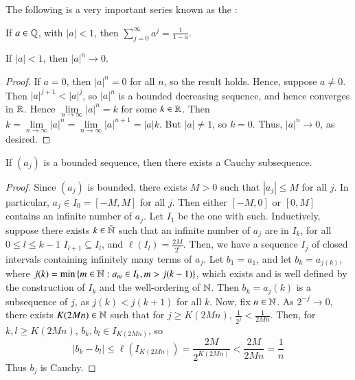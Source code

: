The following is a very important series known as the :

\begin{prop}
    If $a \in \mathbb Q$, with $|a| < 1$, then $\sum_{j=0}^{\infty}a^j = \frac{1}{1-a}$.
\end{prop}

\begin{prop}
    If $|a| < 1$, then $|a|^n\rightarrow 0$.
\end{prop}
\begin{proof}
    If $a = 0$, then $|a|^n = 0$ for all $n$, so the result holds. Hence, suppose $a \neq 0$. Then $|a|^{j+1} < |a|^j$, so $|a|^n$ is a bounded decreasing sequence, and hence converges in $\mathbb R$. Hence $\lim\limits_{n\rightarrow \infty}|a|^n = k$ for some $k \in \mathbb R$. Then $k = \lim\limits_{n\rightarrow \infty}|a|^n = \lim\limits_{n\rightarrow \infty}|a|^{n+1} = |a|k$. But $|a| \neq 1$, so $k = 0$. Thus, $|a|^n\rightarrow 0$, as desired.
\end{proof}


\begin{prop}
    If $(a_j)$ is a bounded sequence, then there exists a Cauchy subsequence.
\end{prop}
\begin{proof}
    Since $(a_j)$ is bounded, there exists $M > 0$ such that $|a_j| \leq M$ for all $j$. In particular, $a_j \in I_0 = [-M,M]$ for all $j$. Then either $[-M,0]$ or $[0,M]$ contains an infinite number of $a_j$. Let $I_1$ be the one with such. Inductively, suppose there exists $k \in \tilde{\mathbb N}$ such that an infinite number of $a_j$ are in $I_k$, for all $0 \leq l \leq k-1$ $I_{l+1}\subseteq I_l$, and $\ell(I_l) = \frac{2M}{2^l}$. Then, we have a sequence $I_j$ of closed intervals containing infinitely many terms of $a_j$. Let $b_1 = a_1$, and let $b_k = a_{j(k)}$, where $j(k) = \min\left\{m \in \mathbb N: a_m \in I_k, m > j(k-1)\right\}$, which exists and is well defined by the construction of $I_k$ and the well-ordering of $\mathbb N$. Then $b_k = a_j(k)$ is a subsequence of $j$, as $j(k) < j(k+1)$ for all $k$. Now, fix $n \in \mathbb N$. As $2^{-j}\rightarrow 0$, there exists $K(2Mn) \in \mathbb N$ such that for $j \geq K(2Mn)$, $\frac{1}{2^j} < \frac{1}{2Mn}$. Then, for $k,l \geq K(2Mn)$, $b_k,b_l \in I_{K(2Mn)}$, so $$|b_k - b_l| \leq \ell(I_{K(2Mn)}) = \frac{2M}{2^{K(2Mn)}} < \frac{2M}{2Mn} = \frac{1}{n}$$ Thus $b_j$ is Cauchy.
\end{proof}

